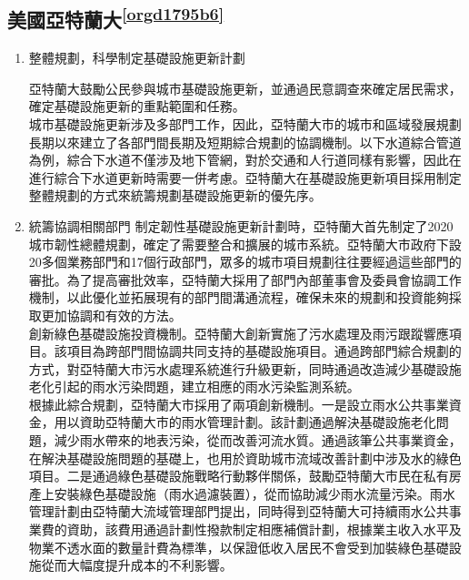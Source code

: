 \documentclass[a4paper,12pt]{article}
\begin{document}
\subsection{美國亞特蘭大\textsuperscript{\ref{orgd1795b6}}}
\label{sec:orgff32727}
\begin{enumerate}
\item 整體規劃，科學制定基礎設施更新計劃
\label{sec:org654a0b6}

亞特蘭大鼓勵公民參與城市基礎設施更新，並通過民意調查來確定居民需求，確定基礎設施更新的重點範圍和任務。\\

城市基礎設施更新涉及多部門工作，因此，亞特蘭大市的城市和區域發展規劃長期以來建立了各部門間長期及短期綜合規劃的協調機制。以下水道綜合管道為例，綜合下水道不僅涉及地下管網，對於交通和人行道同樣有影響，因此在進行綜合下水道更新時需要一併考慮。亞特蘭大在基礎設施更新項目採用制定整體規劃的方式來統籌規劃基礎設施更新的優先序。\\

\item 統籌協調相關部門
\label{sec:org7f11912}
制定韌性基礎設施更新計劃時，亞特蘭大首先制定了2020城市韌性總體規劃，確定了需要整合和擴展的城市系統。亞特蘭大市政府下設20多個業務部門和17個行政部門，眾多的城市項目規劃往往要經過這些部門的審批。為了提高審批效率，亞特蘭大採用了部門內部董事會及委員會協調工作機制，以此優化並拓展現有的部門間溝通流程，確保未來的規劃和投資能夠採取更加協調和有效的方法。\\

創新綠色基礎設施投資機制。亞特蘭大創新實施了污水處理及雨污跟蹤響應項目。該項目為跨部門間協調共同支持的基礎設施項目。通過跨部門綜合規劃的方式，對亞特蘭大市污水處理系統進行升級更新，同時通過改造減少基礎設施老化引起的雨水污染問題，建立相應的雨水污染監測系統。\\

根據此綜合規劃，亞特蘭大市採用了兩項創新機制。一是設立雨水公共事業資金，用以資助亞特蘭大市的雨水管理計劃。該計劃通過解決基礎設施老化問題，減少雨水帶來的地表污染，從而改善河流水質。通過該筆公共事業資金，在解決基礎設施問題的基礎上，也用於資助城市流域改善計劃中涉及水的綠色項目。二是通過綠色基礎設施戰略行動夥伴關係，鼓勵亞特蘭大市民在私有房產上安裝綠色基礎設施（雨水過濾裝置），從而協助減少雨水流量污染。雨水管理計劃由亞特蘭大流域管理部門提出，同時得到亞特蘭大可持續雨水公共事業費的資助，該費用通過計劃性撥款制定相應補償計劃，根據業主收入水平及物業不透水面的數量計費為標準，以保證低收入居民不會受到加裝綠色基礎設施從而大幅度提升成本的不利影響。\\
\end{enumerate}
\end{document}
